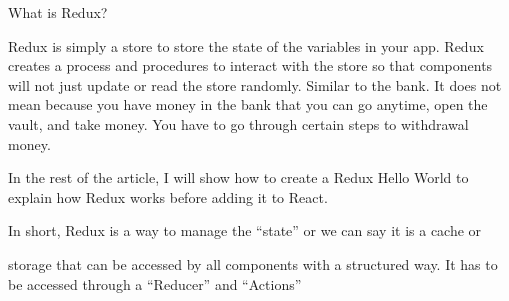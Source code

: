 What is Redux?

Redux is simply a store to store the state of the variables in your app. 
Redux creates a process and procedures to interact with the store so that 
components will not just update or read the store randomly. Similar to the bank. 
It does not mean because you have money in the bank that you can go anytime, open 
the vault, and take money. You have to go through certain steps to withdrawal money.

In the rest of the article, I will show how to create a Redux Hello World to 
explain how Redux works before adding it to React.

In short, Redux is a way to manage the “state” or we can say it is a cache or 

storage that can be accessed by all components with a structured way. It has to 
be accessed through a “Reducer” and “Actions”



